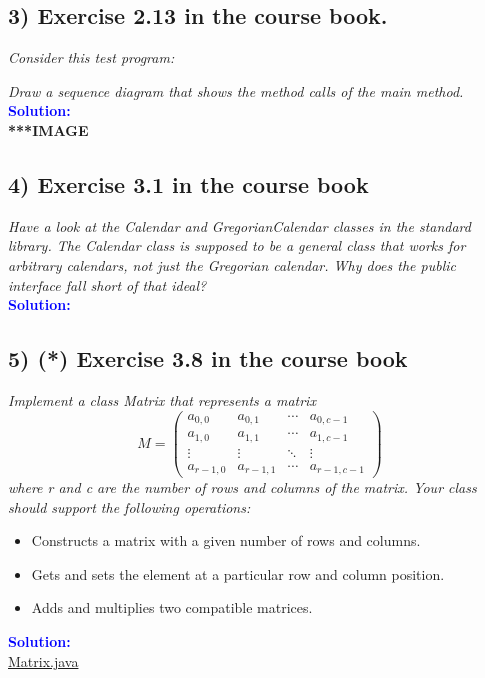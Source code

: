 \documentclass{article}
\begin{document}
\subsection*{3) Exercise 2.13 in the course book.}
\textit{Consider this test program:}

\textit{Draw a sequence diagram that shows the method calls of the main method.} \\
\indent \textbf{\textcolor{blue}{Solution:}} \\
\textbf{***IMAGE}

\subsection*{4) Exercise 3.1 in the course book}
\textit{
    Have a look at the Calendar and GregorianCalendar classes in
    the standard library. The Calendar class is supposed to be a general class that works for arbitrary
    calendars, not just the Gregorian calendar. Why does the public interface fall short of that ideal?}\\
    \indent \textbf{\textcolor{blue}{Solution:}} \\


\subsection{5) (*) Exercise 3.8 in the course book}
\textit{Implement a class Matrix that represents a matrix}\\
$$ 
M = \left( 
\begin{matrix}
a_{0,0} & a_{0,1} & \cdots & a_{0,c-1} \\
a_{1,0} & a_{1,1} & \cdots & a_{1,c-1} \\
\vdots & \vdots & \ddots & \vdots \\
a_{r-1,0} & a_{r-1,1} & \cdots & a_{r-1,c-1} 
\end{matrix} \right)
$$
\textit{
where r and c are the number of rows and columns of the matrix. Your class should support the
following operations:}\\
\begin{itemize}
    \item Constructs a matrix with a given number of rows and columns.
    \item Gets and sets the element at a particular row and column position.
    \item Adds and multiplies two compatible matrices.
\end{itemize}
\indent \textbf{\textcolor{blue}{Solution:}} \\
\href{lst:Matrix}{Matrix.java}
\end{document}
